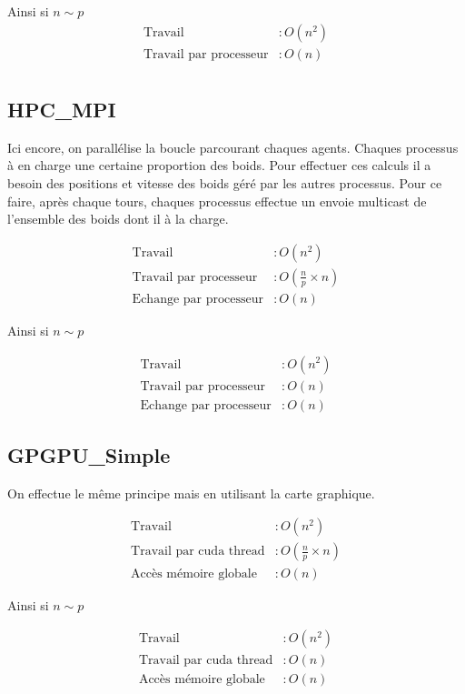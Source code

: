 \documentclass[liens,entete-ensimag,margeCorrection]{ensirapport}
\begin{document}
Ainsi si $n\sim p$
\begin{align*}
    \text{Travail} &: O\left( n^2 \right)  \\
    \text{Travail par processeur} &: O\left( n \right) \\
\end{align*}

\subsection{HPC\_MPI}
Ici encore, on parallélise la boucle parcourant chaques agents.
Chaques processus à en charge une certaine proportion des boids.
Pour effectuer ces calculs il a besoin des positions et vitesse des boids géré par les autres processus.
Pour ce faire, après chaque tours, chaques processus effectue un envoie multicast de l'ensemble des boids dont il à la charge.

\begin{align*}
    \text{Travail} &: O\left( n^2 \right) \\
    \text{Travail par processeur} &: O\left( \frac n p \times n \right)  \\
    \text{Echange par processeur} &: O\left(n\right)
\end{align*}

Ainsi si $n \sim p$

\begin{align*}
    \text{Travail} &: O\left( n^2 \right) \\
    \text{Travail par processeur} &: O\left( n \right)  \\
    \text{Echange par processeur} &: O\left(n\right)
\end{align*}

\subsection{GPGPU\_Simple}

On effectue le même principe mais en utilisant la carte graphique.

\begin{align*}
    \text{Travail} &: O\left( n^2 \right) \\
    \text{Travail par cuda thread} &: O\left( \frac n p \times n \right)  \\
    \text{Accès mémoire globale} &: O\left(n\right)
\end{align*}

Ainsi si $n \sim p$

\begin{align*}
    \text{Travail} &: O\left( n^2 \right) \\
    \text{Travail par cuda thread} &: O\left( n \right)  \\
    \text{Accès mémoire globale} &: O\left(n\right)
\end{align*}
\end{document}

